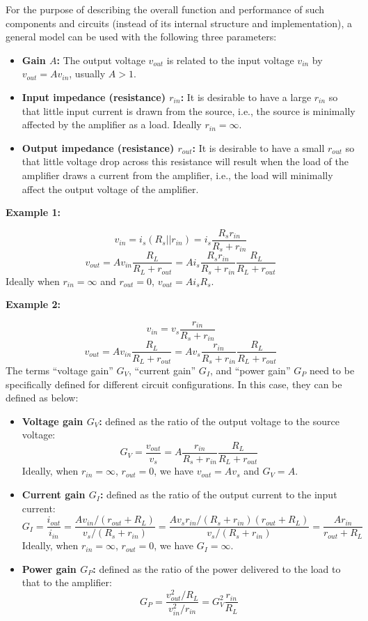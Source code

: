 For the purpose of describing the overall function and performance of such 
components and circuits (instead of its internal structure and implementation), 
a general model can be used with the following three parameters:
\begin{itemize}
\item {\bf Gain $A$:} The output voltage $v_{out}$ is related to the input voltage
  $v_{in}$ by $v_{out}=A v_{in}$, usually $A>1$.
\item {\bf Input impedance (resistance) $r_{in}$:} It is desirable to have a
  large $r_{in}$ so that little input current is drawn from the source, i.e., 
  the source is minimally affected by the amplifier as a load. Ideally 
  $r_{in}=\infty$. 
\item {\bf Output impedance (resistance) $r_{out}$:} It is desirable to have
  a small $r_{out}$ so that little voltage drop across this resistance will 
  result when the load of the amplifier draws a current from the amplifier, i.e.,
  the load will minimally affect the output voltage of the amplifier.
\end{itemize}


{\bf Example 1:}


\[ v_{in}=i_s (R_s || r_{in})=i_s \frac{R_s r_{in}}{R_s+r_{in}} \]
\[ v_{out}=A v_{in} \frac{R_L}{R_L+r_{out}}=
A i_s \frac{R_s r_{in}}{R_s+r_{in}} \frac{R_L}{R_L+r_{out}} \]
Ideally when $r_{in}=\infty$ and $r_{out}=0$, $v_{out}=A i_s R_s$.

{\bf Example 2:}

\[ v_{in}=v_s \frac{r_{in}}{R_s+r_{in}} \]
\[ v_{out}=A v_{in} \frac{R_L}{R_L+r_{out}}
=A v_s \frac{r_{in}}{R_s+r_{in}} \frac{R_L}{R_L+r_{out}} \]
The terms ``voltage gain'' $G_V$, ``current gain'' $G_I$, and ``power gain'' $G_P$
need to be specifically defined for different circuit configurations. In this case,
they can be defined as below:
\begin{itemize}
\item {\bf Voltage gain $G_V$:} defined as the ratio of the output voltage
to the source voltage:
\[ G_V=\frac{v_{out}}{v_s}=A\frac{r_{in}}{R_s+r_{in}} \frac{R_L}{R_L+r_{out}} \]
Ideally, when $r_{in}=\infty$, $r_{out}=0$, we have $v_{out}=A v_s$ and $G_V=A$.

\item {\bf Current gain $G_I$:} defined as the ratio of the output current to
the input current:
\[ G_I=\frac{i_{out}}{i_{in}}=\frac{A v_{in}/(r_{out}+R_L)}{v_s/(R_s+r_{in})}
=\frac{A v_s r_{in}/(R_s+r_{in})(r_{out}+R_L)}{v_s/(R_s+r_{in})}
=\frac{A r_{in}}{r_{out}+R_L} \]
Ideally, when $r_{in}=\infty$, $r_{out}=0$, we have $G_I=\infty$.

\item {\bf Power gain $G_P$: } defined as the ratio of the power delivered to the
load to that to the amplifier:
\[ G_P=\frac{v_{out}^2/R_L}{v_{in}^2/r_{in}}=G_V^2 \frac{r_{in}}{R_L} \]
\end{itemize}

